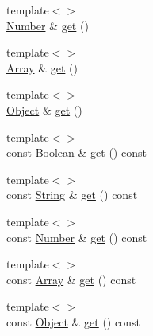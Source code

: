 \begin{DoxyCompactItemize}
\item 
{\footnotesize template$<$$>$ }\\\hyperlink{namespacejsonxx_a189d79e326066a8e082664e4062f3fc8}{Number} \& \hyperlink{classjsonxx_1_1_value_aaf95ad95694f1511ead177a54e1b1af4}{get} ()
\item 
{\footnotesize template$<$$>$ }\\\hyperlink{classjsonxx_1_1_array}{Array} \& \hyperlink{classjsonxx_1_1_value_a651619905bcd83e8b3b372894149f548}{get} ()
\item 
{\footnotesize template$<$$>$ }\\\hyperlink{classjsonxx_1_1_object}{Object} \& \hyperlink{classjsonxx_1_1_value_abd383243656bf4831d1a38c22e141759}{get} ()
\item 
{\footnotesize template$<$$>$ }\\const \hyperlink{namespacejsonxx_aa700abaa02dfd30f2a09ba8e95c6f3eb}{Boolean} \& \hyperlink{classjsonxx_1_1_value_a84110159fd993fd2818636a75718f9d1}{get} () const 
\item 
{\footnotesize template$<$$>$ }\\const \hyperlink{namespacejsonxx_a29c7a7494bb75c227bdbd208dc80a09f}{String} \& \hyperlink{classjsonxx_1_1_value_a8ebb1d92392e40c5d0e9bac778f9ca92}{get} () const 
\item 
{\footnotesize template$<$$>$ }\\const \hyperlink{namespacejsonxx_a189d79e326066a8e082664e4062f3fc8}{Number} \& \hyperlink{classjsonxx_1_1_value_aea4dc5c0be793e798257bbf562378912}{get} () const 
\item 
{\footnotesize template$<$$>$ }\\const \hyperlink{classjsonxx_1_1_array}{Array} \& \hyperlink{classjsonxx_1_1_value_ada7baca4dbe0be4cabe652f0ae099508}{get} () const 
\item 
{\footnotesize template$<$$>$ }\\const \hyperlink{classjsonxx_1_1_object}{Object} \& \hyperlink{classjsonxx_1_1_value_a1f9ef7dd8a5337636ec71699eecf2d3c}{get} () const 
\end{DoxyCompactItemize}
